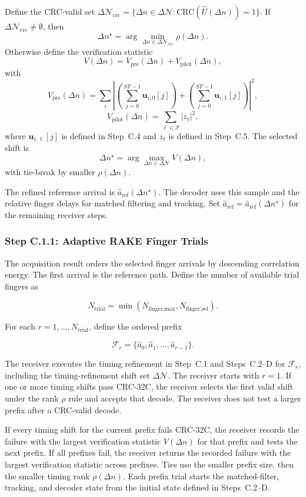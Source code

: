 \documentclass[11pt]{article}
\begin{document}
Define the CRC-valid set $\Delta\mathcal{N}_{\text{crc}}=\{\Delta n\in\Delta\mathcal{N}:\mathrm{CRC}(\hat U(\Delta n))=1\}$. If $\Delta\mathcal{N}_{\text{crc}}\neq\emptyset$, then
\[
  \Delta n^\star=\arg\min_{\Delta n\in\Delta\mathcal{N}_{\text{crc}}}\rho(\Delta n).
\]
Otherwise define the verification statistic
\[
  V(\Delta n)=V_{\text{pre}}(\Delta n)+V_{\text{pilot}}(\Delta n),
\]
with
\[
  V_{\text{pre}}(\Delta n)=\sum_i\left|\left(\sum_{j=0}^{\mathit{SF}-1}\mathbf{u}_{i,0}[j]\right)+\left(\sum_{j=0}^{\mathit{SF}-1}\mathbf{u}_{i,1}[j]\right)\right|^2,
\]
\[
  V_{\text{pilot}}(\Delta n)=\sum_{\ell\in\mathcal{P}}|z_\ell|^2,
\]
where $\mathbf{u}_{i,\ell}[j]$ is defined in Step~C.4 and $z_\ell$ is defined in Step~C.5. The selected shift is
\[
  \Delta n^\star=\arg\max_{\Delta n\in\Delta\mathcal{N}} V(\Delta n),
\]
with tie-break by smaller $\rho(\Delta n)$.

The refined reference arrival is $\hat a_{\text{ref}}(\Delta n^\star)$. The decoder uses this
sample and the relative finger delays for matched filtering and tracking.
Set $\hat a_{\text{ref}}=\hat a_{\text{ref}}(\Delta n^\star)$ for the remaining receiver steps.

\subsubsection{Step C.1.1: Adaptive RAKE Finger Trials}

The acquisition result orders the selected finger arrivals by descending correlation energy.
The first arrival is the reference path. Define the number of available trial fingers as

\[
  N_{\text{trial}}=\min\left(N_{\text{finger,max}},N_{\text{finger,sel}}\right).
\]

For each $r=1,\dots,N_{\text{trial}}$, define the ordered prefix

\[
  \mathcal{F}_r=\{\hat a_0,\hat a_1,\dots,\hat a_{r-1}\}.
\]

The receiver executes the timing refinement in Step~C.1 and Steps~C.2--D for $\mathcal{F}_r$,
including the timing-refinement shift set $\Delta\mathcal{N}$. The receiver starts with $r=1$.
If one or more timing shifts
pass CRC-32C, the receiver selects the first valid shift under the rank $\rho$ rule and
accepts that decode. The receiver does not test a larger prefix after a CRC-valid decode.

If every timing shift for the current prefix fails CRC-32C, the receiver records the failure
with the largest verification statistic $V(\Delta n)$ for that prefix and tests the next
prefix. If all prefixes fail, the receiver returns the recorded failure with the largest
verification statistic across prefixes. Ties use the smaller prefix size, then the smaller
timing rank $\rho(\Delta n)$. Each prefix trial starts the matched-filter, tracking, and
decoder state from the initial state defined in Steps~C.2--D.
\end{document}
